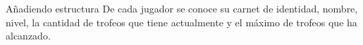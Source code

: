 \begin{frame}{A\~nadiendo estructura}
    De cada {jugador} se conoce su {\color<2>{attr}carnet de identidad}, 
    {nombre}, 
    {\color<2>{attr}nivel}, la 
    {cantidad de trofeos que tiene actualmente} y el 
    {m\'aximo de trofeos que ha alcanzado}.
\end{frame}




        
        

        
        
        

